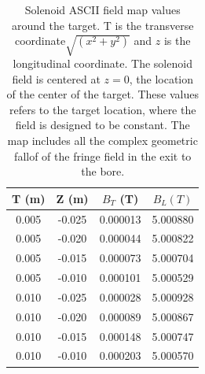 \begin{table}[h]
	\begin{center}
		\begin{tabular}{| c | c | c | c |}
			\hline \hline
			T (m)  & Z (m) &  $B_T$ (T) & $ B_L (T)$ \\
			\hline
          0.005  &  -0.025 & 0.000013  & 5.000880 \\
          0.005  &  -0.020 & 0.000044  & 5.000822 \\
          0.005  &  -0.015 & 0.000073  & 5.000704 \\
          0.005  &  -0.010 & 0.000101  & 5.000529 \\
          0.010  &  -0.025 & 0.000028  & 5.000928 \\
          0.010  &  -0.020 & 0.000089  & 5.000867 \\
          0.010  &  -0.015 & 0.000148  & 5.000747 \\
          0.010  &  -0.010 & 0.000203  & 5.000570 \\
		\hline \hline
		\end{tabular}
	\end{center}
\caption{Solenoid ASCII field map values around the target. T is the transverse coordinate$\sqrt{(x^2+y^2)}$ and
         $z$ is the longitudinal coordinate.
		 The solenoid field is centered at $z=0$, the location of the center of the target.
         These values refers to the target location, where the field is designed to be constant.
         The map includes all the complex geometric fallof of the fringe field in the exit to the bore.}\label{tab:solMap}
\end{table}

